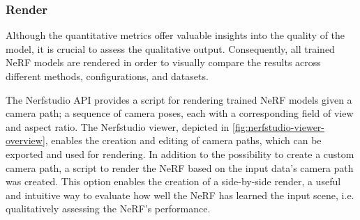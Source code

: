 \subsubsection{Render}

Although the quantitative metrics offer valuable insights into the quality of the model, it is crucial to assess the qualitative output. Consequently, all trained NeRF models are rendered in order to visually compare the results across different methods, configurations, and datasets.

The Nerfstudio API provides a script for rendering trained NeRF models given a camera path; a sequence of camera poses, each with a corresponding field of view and aspect ratio. The Nerfstudio viewer, depicted in \autoref{fig:nerfstudio-viewer-overview}, enables the creation and editing of camera paths, which can be exported and used for rendering. In addition to the possibility to create a custom camera path, a script to render the NeRF based on the input data's camera path was created. This option enables the creation of a side-by-side render, a useful and intuitive way to evaluate how well the NeRF has learned the input scene, i.e. qualitatively assessing the NeRF's performance.


%


